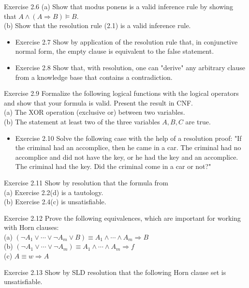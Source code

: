 \documentclass[10pt]{book}
\begin{document}
Exercise 2.6
(a) Show that modus ponens is a valid inference rule by showing that $A \wedge(A \Rightarrow B) \models B$.\\

(b) Show that the resolution rule (2.1) is a valid inference rule.

\begin{itemize}
  \item Exercise 2.7 Show by application of the resolution rule that, in conjunctive normal form, the empty clause is equivalent to the false statement.
  \item Exercise 2.8 Show that, with resolution, one can "derive" any arbitrary clause from a knowledge base that contains a contradiction.
\end{itemize}

Exercise 2.9 Formalize the following logical functions with the logical operators and show that your formula is valid. Present the result in CNF.\\
(a) The XOR operation (exclusive or) between two variables.\\
(b) The statement at least two of the three variables $A, B, C$ are true.

\begin{itemize}
  \item Exercise 2.10 Solve the following case with the help of a resolution proof: "If the criminal had an accomplice, then he came in a car. The criminal had no accomplice and did not have the key, or he had the key and an accomplice. The criminal had the key. Did the criminal come in a car or not?"
\end{itemize}

Exercise 2.11 Show by resolution that the formula from\\
(a) Exercise 2.2(d) is a tautology.\\
(b) Exercise 2.4(c) is unsatisfiable.

Exercise 2.12 Prove the following equivalences, which are important for working with Horn clauses:\\
(a) $\left(\neg A_{1} \vee \cdots \vee \neg A_{m} \vee B\right) \equiv A_{1} \wedge \cdots \wedge A_{m} \Rightarrow B$\\
(b) $\left(\neg A_{1} \vee \cdots \vee \neg A_{m}\right) \equiv A_{1} \wedge \cdots \wedge A_{m} \Rightarrow f$\\
(c) $A \equiv w \Rightarrow A$

Exercise 2.13 Show by SLD resolution that the following Horn clause set is unsatisfiable.
\end{document}
